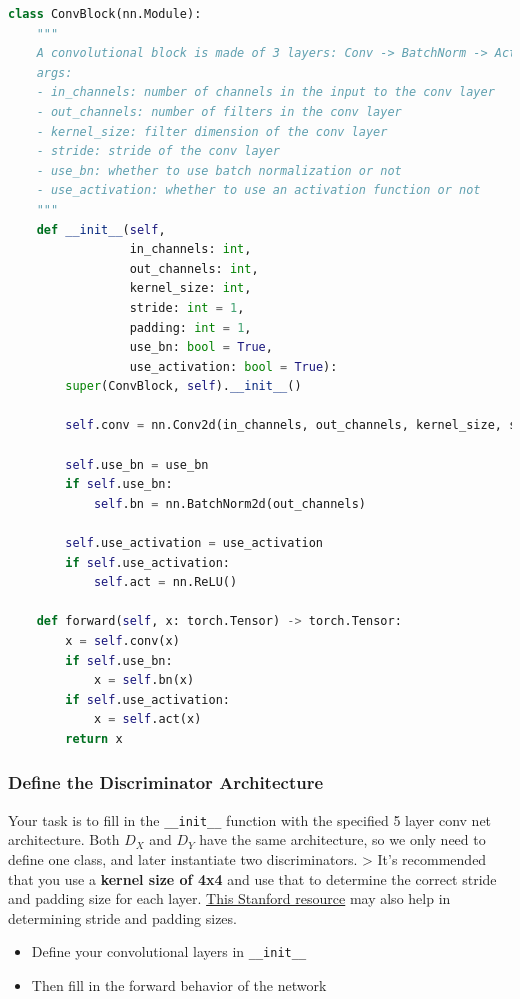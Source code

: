 \begin{lstlisting}[language=Python]
class ConvBlock(nn.Module):
    """
    A convolutional block is made of 3 layers: Conv -> BatchNorm -> Activation.
    args:
    - in_channels: number of channels in the input to the conv layer
    - out_channels: number of filters in the conv layer
    - kernel_size: filter dimension of the conv layer
    - stride: stride of the conv layer
    - use_bn: whether to use batch normalization or not
    - use_activation: whether to use an activation function or not
    """
    def __init__(self, 
                 in_channels: int, 
                 out_channels: int, 
                 kernel_size: int,
                 stride: int = 1,
                 padding: int = 1,
                 use_bn: bool = True,
                 use_activation: bool = True):
        super(ConvBlock, self).__init__()
        
        self.conv = nn.Conv2d(in_channels, out_channels, kernel_size, stride=stride, padding=padding, bias=False)
        
        self.use_bn = use_bn
        if self.use_bn:
            self.bn = nn.BatchNorm2d(out_channels)
            
        self.use_activation = use_activation
        if self.use_activation:
            self.act = nn.ReLU()
        
    def forward(self, x: torch.Tensor) -> torch.Tensor:
        x = self.conv(x)
        if self.use_bn:
            x = self.bn(x)
        if self.use_activation:
            x = self.act(x)
        return x
\end{lstlisting}

\subsubsection{Define the Discriminator Architecture}

Your task is to fill in the \lstinline{__init__}
function with the specified 5 layer conv net architecture. Both \(D_X\)
and \(D_Y\) have the same architecture, so we only need to define one
class, and later instantiate two discriminators. \textgreater{} It's
recommended that you use a \textbf{kernel size of 4x4} and use that to
determine the correct stride and padding size for each layer.
\href{http://cs231n.github.io/convolutional-networks/\#conv}{This
Stanford resource} may also help in determining stride and padding
sizes.

\begin{itemize}

\item  Define your convolutional layers in \lstinline{__init__}
\item  Then fill in the forward behavior of the network
\end{itemize}

